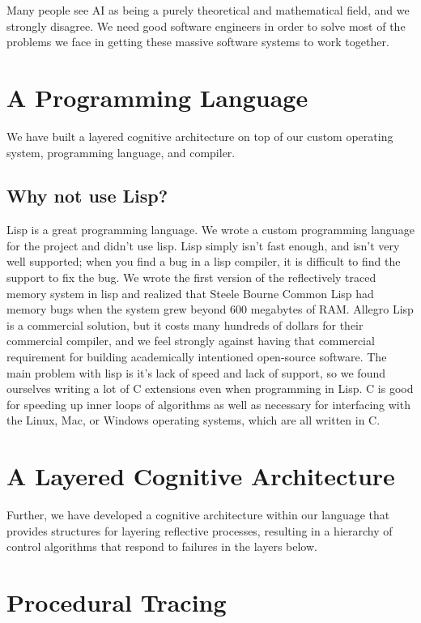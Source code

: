 Many people see AI as being a purely theoretical and mathematical
field, and we strongly disagree.  We need good software engineers in
order to solve most of the problems we face in getting these massive
software systems to work together.

\section{A Programming Language}

We have built a layered cognitive architecture on top of our custom
operating system, programming language, and compiler.

\subsection{Why not use Lisp?}

Lisp is a great programming language.  We wrote a custom programming
language for the project and didn't use lisp.  Lisp simply isn't fast
enough, and isn't very well supported; when you find a bug in a lisp
compiler, it is difficult to find the support to fix the bug.  We
wrote the first version of the reflectively traced memory system in
lisp and realized that Steele Bourne Common Lisp had memory bugs when
the system grew beyond 600 megabytes of RAM.  Allegro Lisp is a
commercial solution, but it costs many hundreds of dollars for their
commercial compiler, and we feel strongly against having that
commercial requirement for building academically intentioned
open-source software.  The main problem with lisp is it's lack of
speed and lack of support, so we found ourselves writing a lot of C
extensions even when programming in Lisp.  C is good for speeding up
inner loops of algorithms as well as necessary for interfacing with
the Linux, Mac, or Windows operating systems, which are all written in
C.

\section{A Layered Cognitive Architecture}

Further, we have developed a cognitive architecture within our
language that provides structures for layering reflective processes,
resulting in a hierarchy of control algorithms that respond to
failures in the layers below.




\section{Procedural Tracing}

